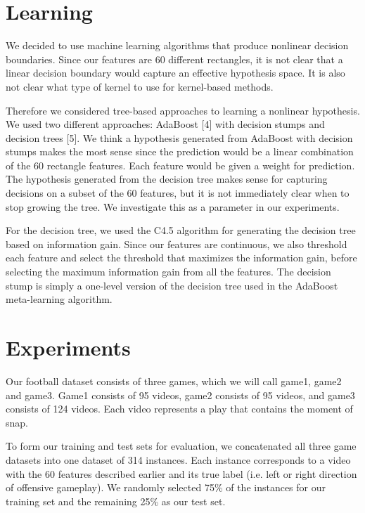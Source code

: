 \documentclass{article} %
\begin{document}
\section{Learning}

We decided to use machine learning algorithms that produce nonlinear decision boundaries. Since our features are 60 different rectangles, it is not clear that a linear decision boundary would capture an effective hypothesis space. It is also not clear what type of kernel to use for kernel-based methods.

Therefore we considered tree-based approaches to learning a nonlinear hypothesis. We used two different approaches: AdaBoost [4] with decision stumps and decision trees [5]. We think a hypothesis generated from AdaBoost with decision stumps makes the most sense since the prediction would be a linear combination of the 60 rectangle features. Each feature would be given a weight for prediction. The hypothesis generated from the decision tree makes sense for capturing decisions on a subset of the 60 features, but it is not immediately clear when to stop growing the tree. We investigate this as a parameter in our experiments.

For the decision tree, we used the C4.5 algorithm for generating the decision tree based on information gain. Since our features are continuous, we also threshold each feature and select the threshold that maximizes the information gain, before selecting the maximum information gain from all the features. The decision stump is simply a one-level version of the decision tree used in the AdaBoost meta-learning algorithm.

\section{Experiments}

Our football dataset consists of three games, which we will call game1, game2 and game3. Game1 consists of 95 videos, game2 consists of 95 videos, and game3 consists of 124 videos. Each video represents a play that contains the moment of snap.

To form our training and test sets for evaluation, we concatenated all three game datasets into one dataset of 314 instances. Each instance corresponds to a video with the 60 features described earlier and its true label (i.e. left or right direction of offensive gameplay). We randomly selected 75\% of the instances for our training set and the remaining 25\% as our test set.
\end{document}
